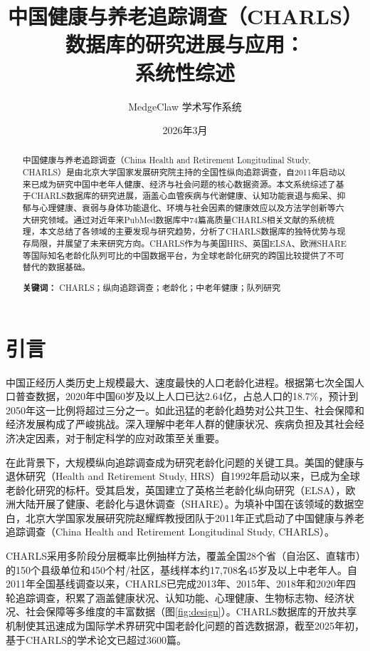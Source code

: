 \documentclass[12pt,a4paper]{article}
\title{\textbf{中国健康与养老追踪调查（CHARLS）数据库的研究进展与应用：\\系统性综述}}
\author{MedgeClaw 学术写作系统}
\date{2026年3月}
\begin{document}
\maketitle

\begin{abstract}
中国健康与养老追踪调查（China Health and Retirement Longitudinal Study, CHARLS）是由北京大学国家发展研究院主持的全国性纵向追踪调查，自2011年启动以来已成为研究中国中老年人健康、经济与社会问题的核心数据资源。本文系统综述了基于CHARLS数据库的研究进展，涵盖心血管疾病与代谢健康、认知功能衰退与痴呆、抑郁与心理健康、衰弱与身体功能退化、环境与社会因素的健康效应以及方法学创新等六大研究领域。通过对近年来PubMed数据库中74篇高质量CHARLS相关文献的系统梳理，本文总结了各领域的主要发现与研究趋势，分析了CHARLS数据库的独特优势与现存局限，并展望了未来研究方向。CHARLS作为与美国HRS、英国ELSA、欧洲SHARE等国际知名老龄化队列可比的中国数据平台，为全球老龄化研究的跨国比较提供了不可替代的数据基础。

\noindent\textbf{关键词：} CHARLS；纵向追踪调查；老龄化；中老年健康；队列研究
\end{abstract}

\section{引言}

中国正经历人类历史上规模最大、速度最快的人口老龄化进程。根据第七次全国人口普查数据，2020年中国60岁及以上人口已达2.64亿，占总人口的18.7\%，预计到2050年这一比例将超过三分之一\citep{nbschina2021}。如此迅猛的老龄化趋势对公共卫生、社会保障和经济发展构成了严峻挑战\citep{fang2015rapid}。深入理解中老年人群的健康状况、疾病负担及其社会经济决定因素，对于制定科学的应对政策至关重要。

在此背景下，大规模纵向追踪调查成为研究老龄化问题的关键工具。美国的健康与退休研究（Health and Retirement Study, HRS）\citep{sonnega2014cohort}自1992年启动以来，已成为全球老龄化研究的标杆。受其启发，英国建立了英格兰老龄化纵向研究（ELSA）\citep{steptoe2013cohort}，欧洲大陆开展了健康、老龄化与退休调查（SHARE）\citep{borsch2013data}。为填补中国在该领域的数据空白，北京大学国家发展研究院赵耀辉教授团队于2011年正式启动了中国健康与养老追踪调查（China Health and Retirement Longitudinal Study, CHARLS）\citep{zhao2014cohort}。

CHARLS采用多阶段分层概率比例抽样方法，覆盖全国28个省（自治区、直辖市）的150个县级单位和450个村/社区，基线样本约17,708名45岁及以上中老年人。自2011年全国基线调查以来，CHARLS已完成2013年、2015年、2018年和2020年四轮追踪调查，积累了涵盖健康状况、认知功能、心理健康、生物标志物、经济状况、社会保障等多维度的丰富数据（图\ref{fig:design}）。CHARLS数据库的开放共享机制使其迅速成为国际学术界研究中国老龄化问题的首选数据源，截至2025年初，基于CHARLS的学术论文已超过3600篇。
\end{document}
